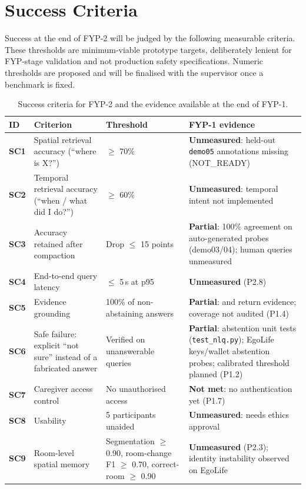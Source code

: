 \section{Success Criteria}
\label{sec:success}
Success at the end of FYP-2 will be judged by the following measurable
criteria. These thresholds are minimum-viable prototype targets, deliberately
lenient for FYP-stage validation and not production safety specifications. Numeric thresholds are proposed and will be finalised with the
supervisor once a benchmark is fixed.

\begin{table}[H]
\centering\footnotesize
\caption{Success criteria for FYP-2 and the evidence available at the end of FYP-1.}
\label{tab:success}
\begin{tabularx}{\textwidth}{@{}>{\bfseries}l Y L{2.9cm} Y@{}}
\toprule
{}\textbf{ID} & \textbf{Criterion} & \textbf{Threshold} & \textbf{FYP-1 evidence}\\
\midrule
SC1 & Spatial retrieval accuracy (``where is X?'') & $\geq$ 70\% & \textbf{Unmeasured}: held-out \texttt{demo05} annotations missing (NOT\_READY)\\
SC2 & Temporal retrieval accuracy (``when / what did I do?'') & $\geq$ 60\% & \textbf{Unmeasured}: temporal intent not implemented\\
SC3 & Accuracy retained after compaction & Drop $\leq$ 15 points & \textbf{Partial}: 100\% agreement on auto-generated probes (demo03/04); human queries unmeasured\\
SC4 & End-to-end query latency & $\leq$ 5\,s at p95 & \textbf{Unmeasured} (P2.8)\\
SC5 & Evidence grounding & 100\% of non-abstaining answers & \textbf{Partial}:  and  return evidence; coverage not audited (P1.4)\\
SC6 & Safe failure: explicit ``not sure'' instead of a fabricated answer & Verified on unanswerable queries & \textbf{Partial}: abstention unit tests (\texttt{test\_nlq.py}); EgoLife keys/wallet abstention probes; calibrated threshold planned (P1.2)\\
SC7 & Caregiver access control & No unauthorised access & \textbf{Not met}: no authentication yet (P1.7)\\
SC8 & Usability & 5 participants unaided & \textbf{Unmeasured}: needs ethics approval\\
SC9 & Room-level spatial memory & Segmentation $\geq$ 0.90, room-change F1 $\geq$ 0.70, correct-room $\geq$ 0.90 & \textbf{Unmeasured} (P2.3); identity instability observed on EgoLife\\
\bottomrule
\end{tabularx}
\end{table}

